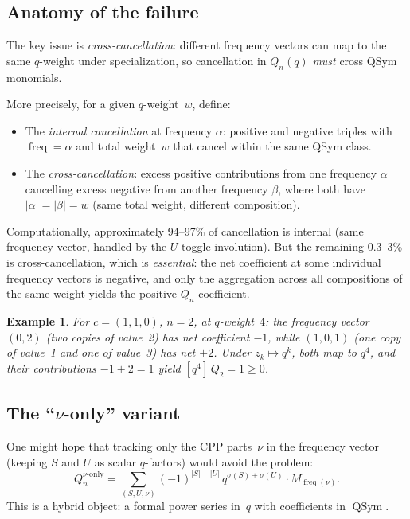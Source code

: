 \documentclass[11pt]{article}
\newtheorem{example}[theorem]{Example}
\newcommand{\QSym}{\operatorname{QSym}}
\begin{document}
\subsection{Anatomy of the failure}

The key issue is \emph{cross-cancellation}: different frequency
vectors can map to the same $q$-weight under specialization,
so cancellation in $Q_n(q)$ \emph{must} cross QSym monomials.

More precisely, for a given $q$-weight~$w$, define:
\begin{itemize}
  \item The \emph{internal cancellation} at frequency $\alpha$:
    positive and negative triples with $\operatorname{freq} = \alpha$
    and total weight~$w$ that cancel within the same QSym class.
  \item The \emph{cross-cancellation}: excess positive contributions
    from one frequency $\alpha$ cancelling excess negative from
    another frequency $\beta$, where both have $|\alpha| = |\beta| = w$
    (same total weight, different composition).
\end{itemize}

Computationally, approximately 94--97\% of cancellation is internal
(same frequency vector, handled by the $U$-toggle involution).
But the remaining 0.3--3\% is cross-cancellation, which is
\emph{essential}: the net coefficient at some individual frequency
vectors is negative, and only the aggregation across all
compositions of the same weight yields the positive $Q_n$ coefficient.

\begin{example}
For $c = (1,1,0)$, $n = 2$, at $q$-weight~$4$:
the frequency vector $(0,2)$ (two copies of value~2)
has net coefficient $-1$, while $(1,0,1)$
(one copy of value~1 and one of value~3) has net $+2$.
Under $z_k \mapsto q^k$, both map to $q^4$,
and their contributions $-1 + 2 = 1$ yield $[q^4]\,Q_2 = 1 \geq 0$.
\end{example}

\subsection{The ``$\nu$-only'' variant}

One might hope that tracking only the CPP parts~$\nu$ in the
frequency vector (keeping $S$ and $U$ as scalar $q$-factors)
would avoid the problem:
\begin{equation}\label{eq:Q-nu-only}
  Q_n^{\nu\text{-only}}
  = \sum_{(S,U,\nu)}
    (-1)^{|S|+|U|}\, q^{\sigma(S)+\sigma(U)}
    \cdot M_{\operatorname{freq}(\nu)}.
\end{equation}
This is a hybrid object: a formal power series in~$q$ with
coefficients in $\QSym$.
\end{document}
